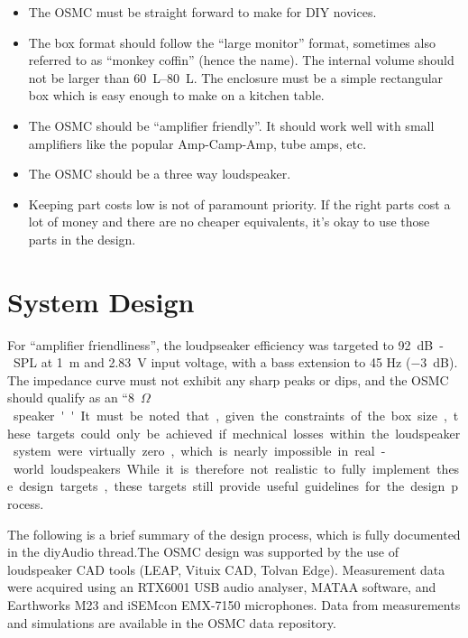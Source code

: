 \documentclass[12pt,a4paper]{article}
\providecommand{\Ohm}{$\Omega$}
\begin{document}
\begin{itemize}
\item The OSMC must be straight forward to make for DIY novices.
\item The box format should follow the ``large monitor'' format, sometimes also referred to as ``monkey coffin'' (hence the name). The internal volume should not be larger than \SIrange{60}{80}{L}. The enclosure must be a simple rectangular box which is easy enough to make on a kitchen table.
\item The OSMC should be ``amplifier friendly''. It should work well with small amplifiers like the popular Amp-Camp-Amp, tube amps, etc.
\item The OSMC should be a three way loudspeaker.
\item Keeping part costs low is not of paramount priority. If the right parts cost a lot of money and there are no cheaper equivalents, it's okay to use those parts in the design.
\end{itemize}

\clearpage


\section{System Design}

For ``amplifier friendliness'', the loudpseaker efficiency was targeted to \SI{92}{dB-SPL} at \SI{1}{m} and \SI{2.83}{V} input voltage, with a bass extension to 45 Hz (\SI{-3}{dB}). The impedance curve must not exhibit any sharp peaks or dips, and the OSMC should qualify as an ``\SI{8}{\Ohm} speaker''. It must be noted that, given the constraints of the box size, these targets could only be achieved if mechnical losses within the loudspeaker system were virtually zero, which is nearly impossible in real-world loudspeakers. While it is therefore not realistic to fully implement these design targets, these targets still provide useful guidelines for the design process.\par

The following is a brief summary of the design process, which is fully documented in the diyAudio thread.\cite{osmc_p1}The OSMC design was supported by the use of loudspeaker CAD tools (LEAP, Vituix CAD, Tolvan Edge). Measurement data were acquired using an RTX6001 USB audio analyser, MATAA software, and Earthworks M23 and iSEMcon EMX-7150 microphones. Data from measurements and simulations are available in the OSMC data repository\cite{osmc_datarepo}.
\end{document}
